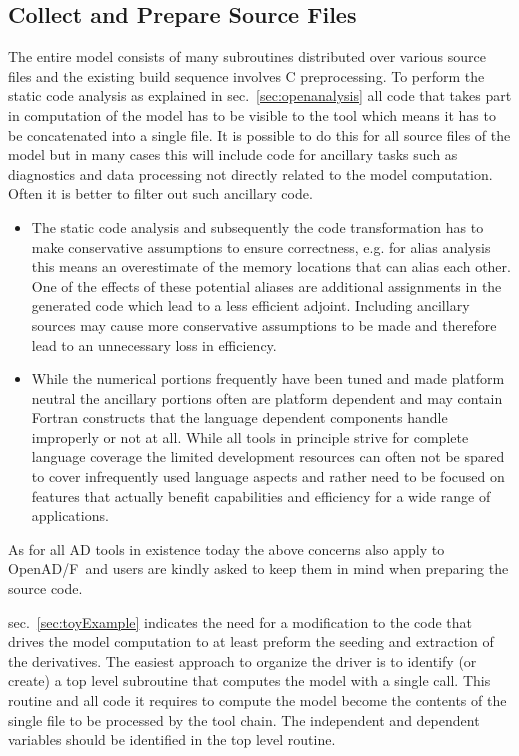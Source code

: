 \documentclass{book}
\newcommand{\OpenADF}{OpenAD/F}
\newcommand{\refsec}[1]{{sec.~\ref{#1}}}
\begin{document}
\subsection{Collect and Prepare Source Files} 
The entire model consists of many subroutines distributed over various 
source files and the existing build sequence involves C preprocessing.
To perform the static code analysis as explained in \refsec{sec:openanalysis}
all code that takes part in computation of the model has to be visible 
to the tool which means it has to be concatenated into a single file. 
It is possible to do this for all source files of the model but in many 
cases this will include code for ancillary tasks such as diagnostics 
and data processing not directly related to the model computation.
Often it is better to filter out such ancillary code. 
\begin{itemize}
\item The static code analysis and subsequently the code transformation
has to make conservative assumptions to ensure 
correctness, e.g. for alias analysis this means an overestimate of 
the memory locations that can alias each other. One of the effects of these potential aliases
are additional assignments in the generated code  which lead to 
a less efficient adjoint. Including ancillary sources may cause more conservative 
assumptions to be made and therefore lead to an unnecessary loss in efficiency.
\item While the numerical portions frequently have been tuned and made platform 
neutral the ancillary portions often are platform dependent and may contain
Fortran constructs that the language dependent components handle improperly or 
not at all. While all tools in principle strive for complete language coverage 
the limited development resources can often not be spared to cover 
infrequently used language aspects and rather need to be focused on features 
that actually benefit capabilities and efficiency for a wide range of applications.
\end{itemize}
As for all AD tools in existence today the above concerns also apply to 
\OpenADF\ and  users are kindly asked to keep them in mind when
preparing the source code.

\refsec{sec:toyExample} indicates the need for a modification 
to the code that drives the model computation to at least 
preform the seeding and extraction of the derivatives. 
The easiest approach to organize the driver is to identify (or create) 
a top level subroutine that computes the model with a single call. 
This routine and all code it requires to compute the model 
become the contents of the single file to be processed by the tool chain.
The independent and dependent variables should be identified in the top level routine.  
\end{document}

